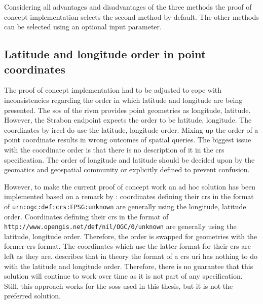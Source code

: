 Considering all advantages and disadvantages of the three methods the proof of concept implementation selects the second method by default. The other methods can be selected using an optional input parameter. 

\subsection{Latitude and longitude order in point coordinates}
The proof of concept implementation had to be adjusted to cope with inconsistencies regarding the order in which latitude and longitude are being presented. The \ac{sos} of the \ac{rivm} provides point geometries as longitude, latitude. However, the Strabon endpoint expects the order to be latitude, longitude. The coordinates by \ac{ircel} do use the latitude, longitude order. Mixing up the order of a point coordinate results in wrong outcomes of spatial queries. The biggest issue with the coordinate order is that there is no description of it in the \ac{crs} specification.  The order of longitude and latitude should be decided upon by the geomatics and geospatial community or explicitly defined to prevent confusion. 

However, to make the current proof of concept work an ad hoc solution has been implemented based on a remark by \cite{GEO:GDAL}: coordinates defining their \ac{crs} in the format of \texttt{urn:ogc:def:crs:EPSG:unknown} are generally using the longitude, latitude order. Coordinates defining their \ac{crs} in the format of \texttt{http://www.opengis.net/def/nil/OGC/0/unknown} are generally using the latitude, longitude order. Therefore, the order is swapped for geometries with the former \ac{crs} format. The coordinates which use the latter format for their \ac{crs} are left as they are. \cite{GEO:TOOLS} describes that in theory the format of a \ac{crs} \ac{uri} has nothing to do with the latitude and longitude order. Therefore, there is no guarantee that this solution will continue to work over time as it is not part of any specification. Still, this approach works for the \aclp{sos} used in this thesis, but it is not the preferred solution.   

